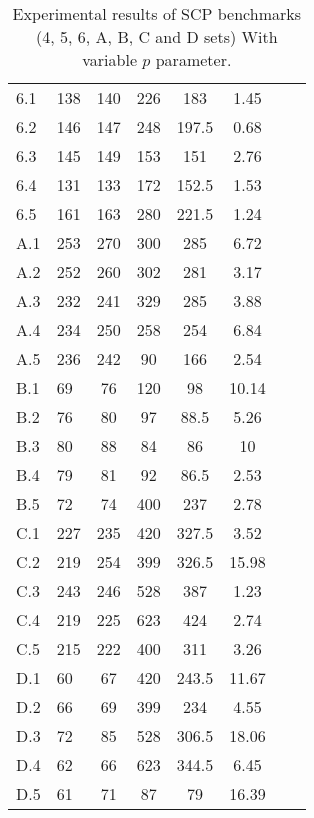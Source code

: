 \begin{table}[H]
\begin{center}
{\begin{tabular*}{1\textwidth}{@{\extracolsep{\fill}} l l c c c c c c }
			   \hline
                            6.1 & 138 & 140 & 226 & 183 & 1.45& \\
                            6.2 & 146 & 147 & 248 & 197.5 & 0.68& \\
                            6.3 & 145 & 149 & 153 & 151 & 2.76& \\
                            6.4 & 131 & 133 & 172 & 152.5 & 1.53& \\
                            6.5 & 161 & 163 & 280 & 221.5 & 1.24& \\
			   \hline
                            A.1  & 253 & 270 & 300 & 285 & 6.72& \\
                            A.2  & 252 & 260 & 302 & 281 & 3.17& \\
                            A.3  & 232 & 241 & 329 & 285 & 3.88& \\
                            A.4  & 234 & 250 & 258 & 254 & 6.84& \\
                            A.5  & 236 & 242 & 90 & 166 & 2.54& \\
			   \hline
                            B.1  & 69 & 76 & 120 & 98 & 10.14& \\
                            B.2  & 76 & 80 & 97 & 88.5 & 5.26& \\
                            B.3  & 80 & 88 & 84 & 86 & 10& \\
                            B.4  & 79 & 81 & 92 & 86.5 & 2.53& \\
                            B.5  & 72 & 74 & 400 & 237 & 2.78& \\
			   \hline
                            C.1  & 227 & 235 & 420 & 327.5 & 3.52& \\
                            C.2  & 219 & 254 & 399 & 326.5 & 15.98& \\
                            C.3  & 243 & 246 & 528 & 387 & 1.23& \\
                            C.4  & 219 & 225 & 623 & 424 & 2.74& \\
                            C.5  & 215 & 222 & 400 & 311 & 3.26& \\
			   \hline
                            D.1  & 60 & 67 & 420 & 243.5 & 11.67& \\
                            D.2  & 66 & 69 & 399 & 234 & 4.55& \\
                            D.3  & 72 & 85 & 528 & 306.5 & 18.06& \\
                            D.4  & 62 & 66 & 623 & 344.5 & 6.45& \\
                            D.5  & 61 & 71 & 87 & 79 & 16.39& \\
			\hline
		\end{tabular*}
		}
	\end{center}
	\caption{Experimental results of SCP benchmarks (4, 5, 6, A, B, C and D sets) With variable $p$ parameter.}\label{table:results2}
\end{table}